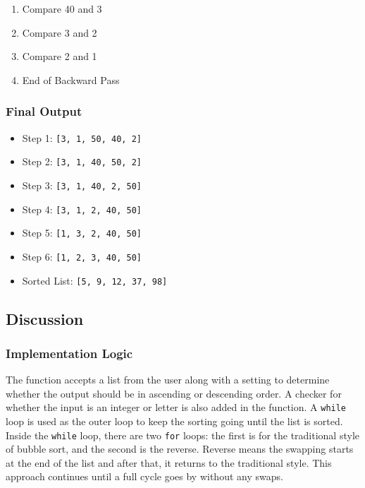\documentclass{article}
\begin{document}
\begin{enumerate}
    \item Compare 40 and 3

    \item Compare 3 and 2

    \item Compare 2 and 1

    \item End of Backward Pass
\end{enumerate}


\subsubsection*{Final Output}
\begin{itemize}
    \item Step 1: \texttt{[3, 1, 50, 40, 2]}
    \item Step 2: \texttt{[3, 1, 40, 50, 2]}
    \item Step 3: \texttt{[3, 1, 40, 2, 50]}
    \item Step 4: \texttt{[3, 1, 2, 40, 50]}
    \item Step 5: \texttt{[1, 3, 2, 40, 50]}
    \item Step 6: \texttt{[1, 2, 3, 40, 50]}
    \item Sorted List: \texttt{[5, 9, 12, 37, 98]}
\end{itemize}

\subsection*{Discussion}
\subsubsection*{Implementation Logic}
The function accepts a list from the user along with a setting to determine whether the output should be in ascending or descending order. A checker for whether the input is an integer or letter is also added in the function. A \texttt{while} loop is used as the outer loop to keep the sorting going until the list is sorted. Inside the \texttt{while} loop, there are two \texttt{for} loops: the first is for the traditional style of bubble sort, and the second is the reverse. Reverse means the swapping starts at the end of the list and after that, it returns to the traditional style. This approach continues until a full cycle goes by without any swaps.
\end{document}
